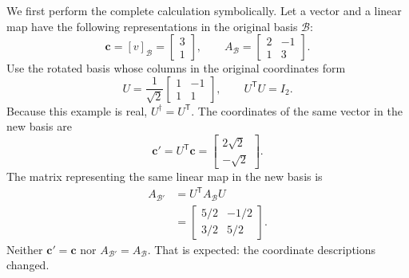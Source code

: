 We first perform the complete calculation symbolically. Let a vector and a
linear map have the following representations in the original basis
\(\mathcal B\):
\begin{equation}
  \mathbf c=[v]_{\mathcal B}
  =\begin{bmatrix}3\\1\end{bmatrix},
  \qquad
  A_{\mathcal B}
  =\begin{bmatrix}
    2 & -1\\
    1 & 3
  \end{bmatrix}.
  \label{eq:training-two-basis-original-data}
\end{equation}
Use the rotated basis whose columns in the original coordinates form
\begin{equation}
  U=\frac{1}{\sqrt2}
  \begin{bmatrix}
    1 & -1\\
    1 & 1
  \end{bmatrix},
  \qquad
  U^{\mathsf T}U=I_2.
  \label{eq:training-two-basis-rotation}
\end{equation}
Because this example is real, \(U^{\dagger}=U^{\mathsf T}\). The coordinates of
the same vector in the new basis are
\begin{equation}
  \mathbf c'
  =U^{\mathsf T}\mathbf c
  =\begin{bmatrix}
    2\sqrt2\\
    -\sqrt2
  \end{bmatrix}.
  \label{eq:training-two-basis-vector-result}
\end{equation}
The matrix representing the same linear map in the new basis is
\begin{align}
  A_{\mathcal B'}
  &=U^{\mathsf T}A_{\mathcal B}U\\
  &=\begin{bmatrix}
      5/2 & -1/2\\
      3/2 & 5/2
    \end{bmatrix}.
  \label{eq:training-two-basis-matrix-result}
\end{align}
Neither \(\mathbf c'=\mathbf c\) nor
\(A_{\mathcal B'}=A_{\mathcal B}\). That is expected:
the coordinate descriptions changed.

